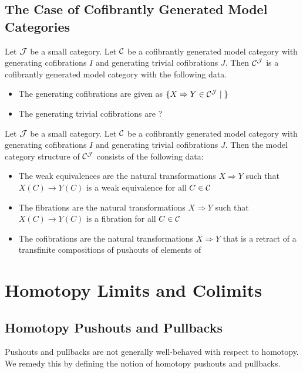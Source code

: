 \documentclass[a4paper]{article}
\begin{document}
\subsection{The Case of Cofibrantly Generated Model Categories}
\begin{thm}{}{} Let $\mathcal{J}$ be a small category. Let $\mathcal{C}$ be a cofibrantly generated model category with generating cofibrations $I$ and generating trivial cofibrations $J$. Then $\mathcal{C}^{\mathcal{J}}$ is a cofibrantly generated model category with the following data. 
\begin{itemize}
\item The generating cofibrations are given as $\{X\Rightarrow Y\in\mathcal{C}^{\mathcal{J}}\;|\;\}$
\item The generating trivial cofibrations are ?
\end{itemize}
\end{thm}

\begin{prp}{}{} Let $\mathcal{J}$ be a small category. Let $\mathcal{C}$ be a cofibrantly generated model category with generating cofibrations $I$ and generating trivial cofibrations $J$. Then the model category structure of $\mathcal{C}^{\mathcal{J}}$ consists of the following data: 
\begin{itemize}
\item The weak equivalences are the natural transformations $X\Rightarrow Y$ such that $X(C)\to Y(C)$ is a weak equivalence for all $C\in\mathcal{C}$
\item The fibrations are the natural transformations $X\Rightarrow Y$ such that $X(C)\to Y(C)$ is a fibration for all $C\in\mathcal{C}$
\item The cofibrations are the natural transformations $X\Rightarrow Y$ that is a retract of a transfinite compositions of pushouts of elements of 
\end{itemize}
\end{prp}

\pagebreak
\section{Homotopy Limits and Colimits}
\subsection{Homotopy Pushouts and Pullbacks}
Pushouts and pullbacks are not generally well-behaved with respect to homotopy. We remedy this by defining the notion of homotopy pushouts and pullbacks. 
\end{document}

